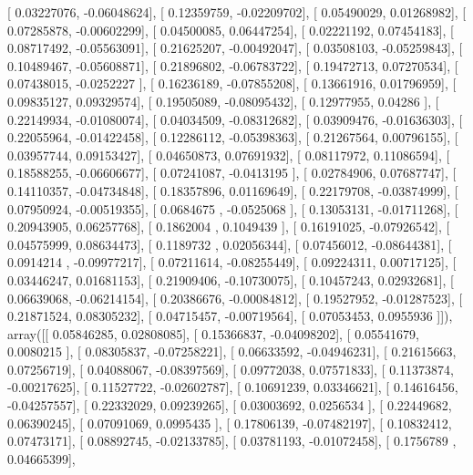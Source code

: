 \documentclass{article}
\begin{document}
       [ 0.03227076, -0.06048624],
       [ 0.12359759, -0.02209702],
       [ 0.05490029,  0.01268982],
       [ 0.07285878, -0.00602299],
       [ 0.04500085,  0.06447254],
       [ 0.02221192,  0.07454183],
       [ 0.08717492, -0.05563091],
       [ 0.21625207, -0.00492047],
       [ 0.03508103, -0.05259843],
       [ 0.10489467, -0.05608871],
       [ 0.21896802, -0.06783722],
       [ 0.19472713,  0.07270534],
       [ 0.07438015, -0.0252227 ],
       [ 0.16236189, -0.07855208],
       [ 0.13661916,  0.01796959],
       [ 0.09835127,  0.09329574],
       [ 0.19505089, -0.08095432],
       [ 0.12977955,  0.04286   ],
       [ 0.22149934, -0.01080074],
       [ 0.04034509, -0.08312682],
       [ 0.03909476, -0.01636303],
       [ 0.22055964, -0.01422458],
       [ 0.12286112, -0.05398363],
       [ 0.21267564,  0.00796155],
       [ 0.03957744,  0.09153427],
       [ 0.04650873,  0.07691932],
       [ 0.08117972,  0.11086594],
       [ 0.18588255, -0.06606677],
       [ 0.07241087, -0.0413195 ],
       [ 0.02784906,  0.07687747],
       [ 0.14110357, -0.04734848],
       [ 0.18357896,  0.01169649],
       [ 0.22179708, -0.03874999],
       [ 0.07950924, -0.00519355],
       [ 0.0684675 , -0.0525068 ],
       [ 0.13053131, -0.01711268],
       [ 0.20943905,  0.06257768],
       [ 0.1862004 ,  0.1049439 ],
       [ 0.16191025, -0.07926542],
       [ 0.04575999,  0.08634473],
       [ 0.1189732 ,  0.02056344],
       [ 0.07456012, -0.08644381],
       [ 0.0914214 , -0.09977217],
       [ 0.07211614, -0.08255449],
       [ 0.09224311,  0.00717125],
       [ 0.03446247,  0.01681153],
       [ 0.21909406, -0.10730075],
       [ 0.10457243,  0.02932681],
       [ 0.06639068, -0.06214154],
       [ 0.20386676, -0.00084812],
       [ 0.19527952, -0.01287523],
       [ 0.21871524,  0.08305232],
       [ 0.04715457, -0.00719564],
       [ 0.07053453,  0.0955936 ]]), array([[ 0.05846285,  0.02808085],
       [ 0.15366837, -0.04098202],
       [ 0.05541679,  0.0080215 ],
       [ 0.08305837, -0.07258221],
       [ 0.06633592, -0.04946231],
       [ 0.21615663,  0.07256719],
       [ 0.04088067, -0.08397569],
       [ 0.09772038,  0.07571833],
       [ 0.11373874, -0.00217625],
       [ 0.11527722, -0.02602787],
       [ 0.10691239,  0.03346621],
       [ 0.14616456, -0.04257557],
       [ 0.22332029,  0.09239265],
       [ 0.03003692,  0.0256534 ],
       [ 0.22449682,  0.06390245],
       [ 0.07091069,  0.0995435 ],
       [ 0.17806139, -0.07482197],
       [ 0.10832412,  0.07473171],
       [ 0.08892745, -0.02133785],
       [ 0.03781193, -0.01072458],
       [ 0.1756789 ,  0.04665399],
\end{document}
